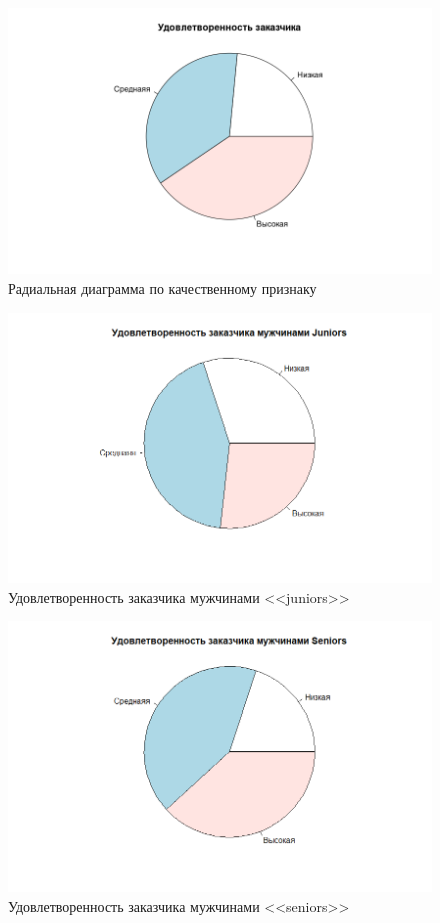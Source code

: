 \begin{figure}[H]
	\centering
	\includegraphics[width=\linewidth]{fig2}
	\caption{Радиальная диаграмма по качественному признаку}
\end{figure}




\begin{figure}[H]
	\centering
	\includegraphics[width=\linewidth]{figmj}
	\caption{Удовлетворенность заказчика мужчинами <<juniors>>}
\end{figure}

\begin{figure}[H]
	\centering
	\includegraphics[width=\linewidth]{figms}
	\caption{Удовлетворенность заказчика мужчинами <<seniors>>}
\end{figure}

